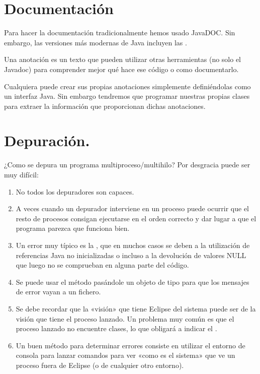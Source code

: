 \documentclass[letterpaper,10pt,spanish]{sphinxmanual}
\begin{document}
\section{Documentación}
\label{\detokenize{textos/tema1:documentacion}}
Para hacer la documentación tradicionalmente hemos usado JavaDOC. Sin embargo, las versiones más modernas de Java incluyen las .

Una anotación es un texto que pueden utilizar otras herramientas (no solo el Javadoc) para comprender mejor qué hace ese código o como documentarlo.

Cualquiera puede crear sus propias anotaciones simplemente definiéndolas como un interfaz Java. Sin embargo tendremos que programar nuestras propias clases para extraer la información que proporcionan dichas anotaciones.


\section{Depuración.}
\label{\detokenize{textos/tema1:depuracion}}
¿Como se depura un programa multiproceso/multihilo? Por desgracia puede ser muy difícil:
\begin{enumerate}
%
\item {} 
No todos los depuradores son capaces.

\item {} 
A veces cuando un depurador interviene en un proceso puede ocurrir que el resto de procesos consigan ejecutarse en el orden correcto y dar lugar a que el programa parezca que funciona bien.

\item {} 
Un error muy típico es la , que en muchos casos se deben a la utilización de referencias Java no inicializadas o incluso a la devolución de valores NULL que luego no se comprueban en alguna parte del código.

\item {} 
Se puede usar el método  pasándole un objeto de tipo  para que los mensajes de error vayan a un fichero.

\item {} 
Se debe recordar que la «visión» que tiene Eclipse del sistema puede ser  de la visión que tiene el proceso lanzado. Un problema muy común es que el proceso lanzado no encuentre clases, lo que obligará a indicar el .

\item {} 
Un buen método para determinar errores consiste en utilizar el entorno de consola para lanzar comandos para ver «como es el sistema» que ve un proceso fuera de Eclipse (o de cualquier otro entorno).

\end{enumerate}
\end{document}
